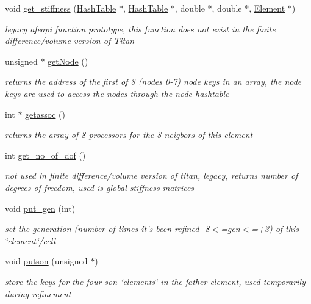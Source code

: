 \begin{CompactItemize}
void \hyperlink{classElement_a9}{get\_\-stiffness} (\hyperlink{classHashTable}{Hash\-Table} $\ast$, \hyperlink{classHashTable}{Hash\-Table} $\ast$, double $\ast$, double $\ast$, \hyperlink{classElement}{Element} $\ast$)
\begin{CompactList}\small\item\em legacy afeapi function prototype, this function does not exist in the finite difference/volume version of Titan \item\end{CompactList}\item 
unsigned $\ast$ \hyperlink{classElement_a10}{get\-Node} ()
\begin{CompactList}\small\item\em returns the address of the first of 8 (nodes 0-7) node keys in an array, the node keys are used to access the nodes through the node hashtable \item\end{CompactList}\item 
int $\ast$ \hyperlink{classElement_a11}{getassoc} ()
\begin{CompactList}\small\item\em returns the array of 8 processors for the 8 neigbors of this element \item\end{CompactList}\item 
int \hyperlink{classElement_a12}{get\_\-no\_\-of\_\-dof} ()
\begin{CompactList}\small\item\em not used in finite difference/volume version of titan, legacy, returns number of degrees of freedom, used is global stiffness matrices \item\end{CompactList}\item 
void \hyperlink{classElement_a13}{put\_\-gen} (int)
\begin{CompactList}\small\item\em set the generation (number of times it's been refined -8$<$=gen$<$=+3) of this \char`\"{}element\char`\"{}/cell \item\end{CompactList}\item 
void \hyperlink{classElement_a14}{putson} (unsigned $\ast$)
\begin{CompactList}\small\item\em store the keys for the four son \char`\"{}elements\char`\"{} in the father element, used temporarily during refinement \item\end{CompactList}\item 

\end{CompactItemize}
